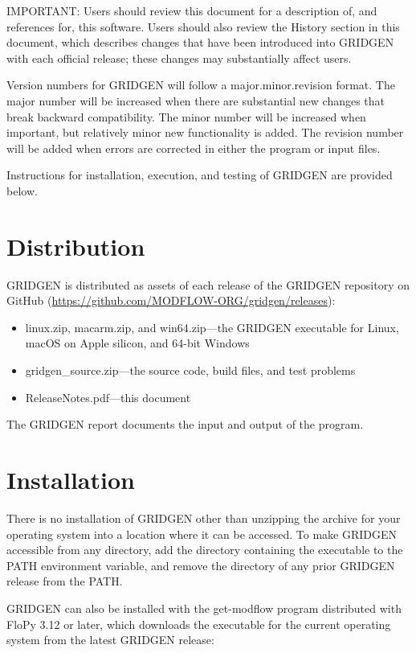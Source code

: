 \documentclass[11pt,twoside,twocolumn]{usgsreport}
\begin{document}
IMPORTANT: Users should review this document for a description of, and references for, this software. Users should also review the History section in this document, which describes changes that have been introduced into GRIDGEN with each official release; these changes may substantially affect users.

Version numbers for GRIDGEN will follow a major.minor.revision format. The major number will be increased when there are substantial new changes that break backward compatibility. The minor number will be increased when important, but relatively minor new functionality is added. The revision number will be added when errors are corrected in either the program or input files.

Instructions for installation, execution, and testing of GRIDGEN are provided below.

\section{Distribution}

GRIDGEN is distributed as assets of each release of the GRIDGEN repository on GitHub (\url{https://github.com/MODFLOW-ORG/gridgen/releases}):

\begin{itemize}
  \item linux.zip, macarm.zip, and win64.zip---the GRIDGEN executable for Linux, macOS on Apple silicon, and 64-bit Windows
  \item gridgen\_source.zip---the source code, build files, and test problems
  \item ReleaseNotes.pdf---this document
\end{itemize}

The GRIDGEN report \citep{lien2015gridgen} documents the input and output of the program.

\section{Installation}

There is no installation of GRIDGEN other than unzipping the archive for your operating system into a location where it can be accessed. To make GRIDGEN accessible from any directory, add the directory containing the executable to the PATH environment variable, and remove the directory of any prior GRIDGEN release from the PATH.

GRIDGEN can also be installed with the get-modflow program distributed with FloPy 3.12 or later, which downloads the executable for the current operating system from the latest GRIDGEN release:
\end{document}

